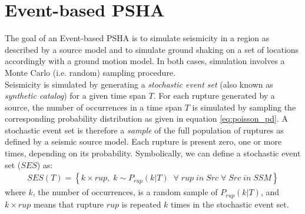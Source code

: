 \section{Event-based PSHA}
The goal of an Event-based PSHA is to simulate seismicity in a region as described by a source model
and to simulate ground shaking on a set of locations accordingly with a ground motion model. In both
cases, simulation involves a Monte Carlo (i.e. random) sampling procedure.\\
Seismicity is simulated by generating a \textit{stochastic event set} (also known as \textit{synthetic catalog})
for a given time span $T$. For each rupture generated by a source,
the number of occurrences in a time span $T$ is simulated by sampling the corresponding probability
distribution as given in equation \ref{eq:poisson_pd}. A stochastic event set is therefore a \textit{sample}
of the full population of ruptures as defined by a seismic source model. Each rupture is present zero, one or
more times, depending on its probability. Symbolically, we can define a stochastic event set ($SES$) as:
\begin{align}
SES(T) = \left\{k \times rup,\;k\sim P_{rup}(k | T)\;\;\forall\;rup\;in\;Src\;\forall\;Src\;in\;SSM\right\}
\end{align}
where $k$, the number of occurrences, is a random sample of $P_{rup}(k | T)$, and $k \times rup$ means
that rupture $rup$ is repeated $k$ times in the stochastic event set.

